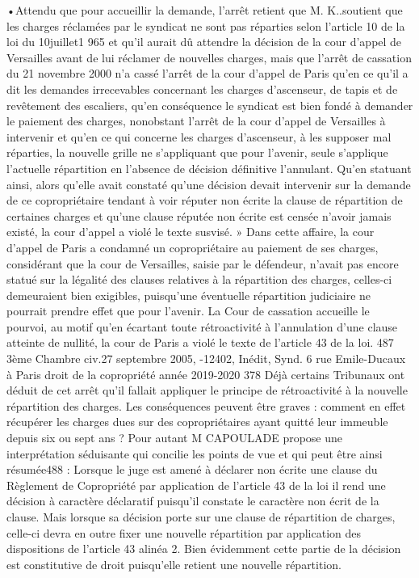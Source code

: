 •Attendu que pour accueillir la demande, l’arrêt retient que M. K..soutient que les charges réclamées par le syndicat ne sont pas réparties selon l’article 10 de la loi du 10juillet1 965 et qu’il aurait dû attendre la décision de la cour d’appel de Versailles avant de lui réclamer de nouvelles charges, mais que l’arrêt de cassation du 21 novembre 2000 n’a cassé l’arrêt de la cour d’appel de Paris qu’en ce qu’il a dit les demandes irrecevables concernant les charges d’ascenseur, de tapis et de revêtement des escaliers, qu’en conséquence le syndicat est bien fondé à demander le paiement des charges, nonobstant l’arrêt de la cour d’appel de Versailles à intervenir et qu’en ce qui concerne les charges d’ascenseur, à les supposer mal réparties, la nouvelle grille ne s’appliquant que pour l’avenir, seule s’applique l’actuelle répartition en l’absence de décision définitive l’annulant.
Qu’en statuant ainsi, alors qu’elle avait constaté qu’une décision devait intervenir sur la demande de ce copropriétaire tendant à voir réputer non écrite la clause de répartition de certaines charges et qu’une clause réputée non écrite est censée n’avoir jamais existé, la cour d’appel a violé le texte susvisé. »
Dans cette affaire, la cour d’appel de Paris a condamné un copropriétaire au paiement de ses charges, considérant que la cour de Versailles, saisie par le défendeur, n’avait pas encore statué sur la légalité des clauses relatives à la répartition des charges, celles-ci demeuraient bien exigibles, puisqu’une éventuelle répartition judiciaire ne pourrait prendre effet que pour l’avenir. La Cour de cassation accueille le pourvoi, au motif qu’en écartant toute rétroactivité à l’annulation d’une clause atteinte de nullité, la cour de Paris a violé le texte de l’article 43 de la loi.
487 3ème Chambre civ.27 septembre 2005, -12402, Inédit, Synd. 6 rue Emile-Ducaux à Paris
droit de la copropriété année 2019-2020
378
Déjà certains Tribunaux ont déduit de cet arrêt qu’il fallait appliquer le principe de rétroactivité à la nouvelle répartition des charges. Les conséquences peuvent être graves : comment en effet récupérer les charges dues sur des copropriétaires ayant quitté leur immeuble depuis six ou sept ans ?
Pour autant M CAPOULADE propose une interprétation séduisante qui concilie les points de vue et qui peut être ainsi résumée488 :
Lorsque le juge est amené à déclarer non écrite une clause du Règlement de Copropriété par application de l’article 43 de la loi il rend une décision à caractère déclaratif puisqu’il constate le caractère non écrit de la clause. Mais lorsque sa décision porte sur une clause de répartition de charges, celle-ci devra en outre fixer une nouvelle répartition par application des dispositions de l’article 43 alinéa 2. Bien évidemment cette partie de la décision est constitutive de droit puisqu’elle retient une nouvelle répartition.
